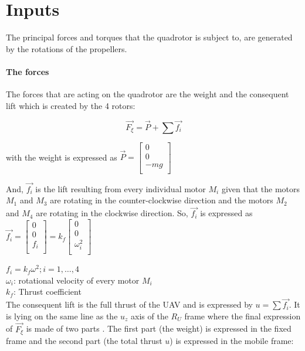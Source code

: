 \documentclass{thesisreport}
\begin{document}
\newpage


\section{Inputs}

The principal forces and torques that the quadrotor is subject to, are generated by the rotations of the propellers. 

\paragraph{The forces} The forces that are acting on the quadrotor are the weight and the consequent lift which is created by the 4 rotors:

\begin{equation}
\overrightarrow{F_{\xi}}= \overrightarrow{P} + \sum \overrightarrow{f_i}
\end{equation} 

with the weight is expressed as 
$ \overrightarrow{P}= \begin{bmatrix}
0 \\ 
0 \\
-mg \\
\end{bmatrix}$

And, $\overrightarrow{f_{i}}$ is the lift resulting from every individual motor $M_i$ given that the motors $M_1$ and $M_3$ are rotating in the counter-clockwise direction and the motors $M_2$ and $M_4$ are rotating in the clockwise direction. So, $\overrightarrow{f_i}$ is expressed as $\overrightarrow{f_i}=\begin{bmatrix}
0 \\ 
0 \\
f_i \\
\end{bmatrix}=k_f \begin{bmatrix}
0 \\ 
0 \\
\omega_i^2 \\
\end{bmatrix} $  

$f_i = k_f \omega^2; i=1,\ldots,4$\\
$\omega_i$: rotational velocity of every motor $M_i$\\
$k_f$: Thrust coefficient\\

The consequent lift is the full thrust of the UAV and is expressed by $u=\sum \overrightarrow{f_i}$. It is lying on the same line as the $u_z$ axis of the $R_U$ frame where the final expression of $\overrightarrow{F_{\xi}}$ is made of two parts . The first part (the weight)  is expressed in the fixed frame and the second part (the total thrust $u$) is expressed in the mobile frame: 
\end{document}
